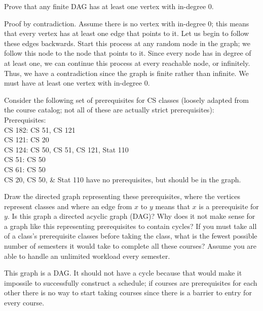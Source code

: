 \documentclass[solution, letterpaper]{cs20inclass}
\begin{document}
\problem
Prove that any finite DAG has at least one vertex with in-degree 0.


\begin{solution}
Proof by contradiction. Assume there is no vertex with in-degree 0; this means that every vertex has at least one edge that points to it. Let us begin to follow these edges backwards. Start this process at any random node in the graph; we follow this node to the node that points to it. Since every node has in degree of at least one, we can continue this process at every reachable node, or infinitely. Thus, we have a contradiction since the graph is finite rather than infinite. We must have at least one vertex with in-degree 0. 


\end{solution}

\problem
Consider the following set of prerequisites for CS classes (loosely adapted from the course catalog; not all of these are actually strict prerequisites): \\
Prerequisites: \\
CS 182: CS 51, CS 121 \\
CS 121: CS 20 \\
CS 124: CS 50, CS 51, CS 121, Stat 110 \\
CS 51: CS 50 \\
CS 61: CS 50 \\
CS 20, CS 50, \& Stat 110 have no prerequisites, but should be in the graph.

\subproblem Draw the directed graph representing these prerequisites, where the vertices represent classes and where an edge from $x$ to $y$ means that $x$ is a prerequisite for $y$.
\subproblem Is this graph a directed acyclic graph (DAG)? Why does it not make sense for a graph like this representing prerequisites to contain cycles?
\subproblem If you must take all of a class's prerequisite classes before taking the class, what is the fewest possible number of semesters it would take to complete all these courses? Assume you are able to handle an unlimited workload every semester.

\begin{solution}
\subsolution
\subsolution This graph is a DAG. It should not have a cycle because that would make it impossile to successfully construct a schedule; if courses are prerequisites for each other there is no way to start taking courses since there is a barrier to entry for every course. 
\subsolution


\end{solution}
\end{document}
